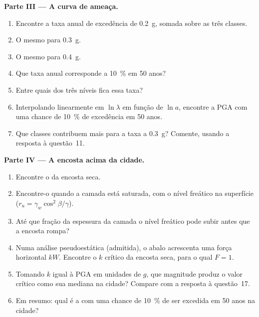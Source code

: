 \begin{problem}
\noindent\textbf{Parte III --- A curva de ameaça.}
\begin{enumerate}[resume]
  \item Encontre a taxa anual de excedência de \qty{0.2}{g}, somada sobre as três classes.
  \item O mesmo para \qty{0.3}{g}.
  \item O mesmo para \qty{0.4}{g}.
  \item Que taxa anual corresponde a \qty{10}{\percent} em 50 anos?
  \item Entre quais dos três níveis fica essa taxa?
  \item Interpolando linearmente em $\ln\lambda$ em função de $\ln a$, encontre a PGA com uma
        chance de \qty{10}{\percent} de excedência em 50 anos.
  \item Que classes contribuem mais para a taxa a \qty{0.3}{g}? Comente, usando a resposta à
        questão~11.
\end{enumerate}

\noindent\textbf{Parte IV --- A encosta acima da cidade.}
\begin{enumerate}[resume]
  \item Encontre o  da encosta seca.
  \item Encontre-o quando a camada está saturada, com o nível freático na superfície ($r_u =
        \gamma_w\cos^2\beta/\gamma$).
  \item Até que fração da espessura da camada o nível freático pode subir antes que a encosta rompa?
  \item Numa análise pseudoestática (admitida), o abalo acrescenta uma força horizontal $kW$. Encontre o
        $k$ crítico da encosta seca, para o qual $F = 1$.
  \item Tomando $k$ igual à PGA em unidades de $g$, que magnitude produz o valor crítico como
        sua mediana na cidade? Compare com a resposta à questão~17.
  \item Em resumo: qual é a  com uma chance de \qty{10}{\percent} de ser
        excedida em 50 anos na cidade?
\end{enumerate}
\end{problem}
